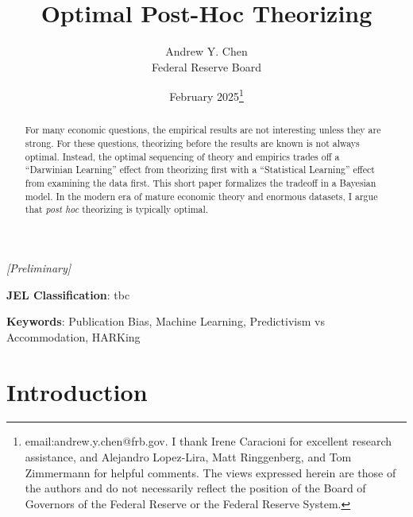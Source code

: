 \documentclass[12pt,english]{article}
\theoremstyle{plain}
\theoremstyle{plain}
\begin{document}
\title{Optimal Post-Hoc Theorizing}

\newif\ifanon
\anontrue
\anonfalse %

\ifanon
    \author{}
    \date{}
\else
    \author{{Andrew Y. Chen}\\
    {\normalsize Federal Reserve Board}}
    \date{February 2025\thanks{email:andrew.y.chen@frb.gov. I thank Irene Caracioni for excellent research assistance, and Alejandro Lopez-Lira, Matt Ringgenberg, and Tom Zimmermann for helpful comments. The views expressed herein are those of the authors and do not necessarily reflect the position of the Board of Governors of the Federal Reserve or the Federal Reserve System.}}
\fi

\maketitle

\begin{center}
    \textit{[Preliminary]}
\end{center}
 
\begin{abstract}
\begin{singlespace}
\noindent For many economic questions, the empirical results are not interesting unless they are strong. For these questions, theorizing before the results are known is not always optimal. Instead, the optimal sequencing of theory and empirics trades off a ``Darwinian Learning'' effect from theorizing first with a ``Statistical Learning'' effect from examining the data first. This short paper formalizes the tradeoff in a Bayesian model. In the modern era of mature economic theory and enormous datasets, I argue that \emph{post hoc} theorizing is typically optimal.
\end{singlespace}
\end{abstract}
\vspace{10ex}
 \textbf{\color{Black}JEL Classification}: tbc

\noindent\textbf{\color{Black}Keywords}: Publication Bias, Machine Learning,  Predictivism vs Accommodation, HARKing
\thispagestyle{empty}\setcounter{page}{0}

\vspace{10ex}

\pagebreak{}

\section{Introduction}
\end{document}
